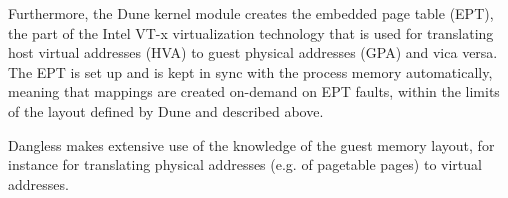 Furthermore, the Dune kernel module creates the embedded page table (EPT), the part of the Intel VT-x virtualization technology that is used for translating host virtual addresses (HVA) to guest physical addresses (GPA) and vica versa. The EPT is set up and is kept in sync with the process memory automatically, meaning that mappings are created on-demand on EPT faults, within the limits of the layout defined by Dune and described above.

Dangless makes extensive use of the knowledge of the guest memory layout, for instance for translating physical addresses (e.g. of pagetable pages) to virtual addresses.
